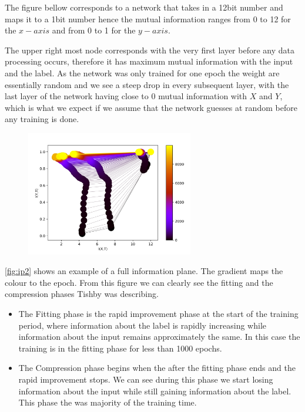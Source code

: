 \documentclass[dissertation.tex]{subfiles}
\begin{document}
The figure bellow corresponds to a network that takes in a 12bit number and maps
it to a 1bit number hence the mutual information ranges from 0 to 12 for the $
x-axis $ and from 0 to 1 for the $ y-axis $.

The upper right most node corresponds with the very first layer before any data
processing occurs, therefore it has maximum mutual information with the input
and the label. As the network was only trained for one epoch the weight are
essentially random and we see a steep drop in every subsequent layer, with the
last layer of the network having close to 0 mutual information with $ X $ and $
Y $, which is what we expect if we assume that the network guesses at random
before any training is done.

\begin{figure}[H]
  \centering
  \includegraphics[width=0.65\textwidth]{figs/ip_10000.png}
  \label{fig:ip2}
\end{figure}

\autoref{fig:ip2} shows an example of a full information plane. The gradient
maps the colour to the epoch. From this figure we can clearly see the fitting
and the compression phases Tishby was describing. 

\begin{itemize}
  \item{
      The Fitting phase is the rapid improvement phase at the start of the
      training period, where information about the label is rapidly increasing
      while information about the input remains approximately the same. In this
      case the training is in the fitting phase for less than 1000 epochs.
    }
  \item{
      The Compression phase begins when the after the fitting phase ends and the
      rapid improvement stops. We can see during this phase we start losing
      information about the input while still gaining information about the
      label. This phase the was majority of the training time.
    }
\end{itemize}
\end{document}
